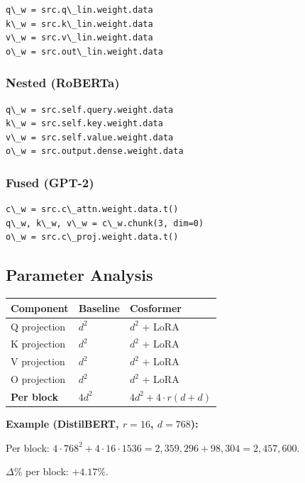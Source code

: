 \begin{lstlisting}
q\_w = src.q\_lin.weight.data
k\_w = src.k\_lin.weight.data
v\_w = src.v\_lin.weight.data
o\_w = src.out\_lin.weight.data
\end{lstlisting}

\subsubsection{Nested (RoBERTa)}

\begin{lstlisting}
q\_w = src.self.query.weight.data
k\_w = src.self.key.weight.data
v\_w = src.self.value.weight.data
o\_w = src.output.dense.weight.data
\end{lstlisting}

\subsubsection{Fused (GPT-2)}

\begin{lstlisting}
c\_w = src.c\_attn.weight.data.t()
q\_w, k\_w, v\_w = c\_w.chunk(3, dim=0)
o\_w = src.c\_proj.weight.data.t()
\end{lstlisting}

\subsection{Parameter Analysis}

\begin{table}[H]
\centering
\small
\begin{tabular}{lll}
\toprule
\textbf{Component} & \textbf{Baseline} & \textbf{Cosformer} \\
\midrule
Q projection & $d^2$ & $d^2$ + LoRA \\
K projection & $d^2$ & $d^2$ + LoRA \\
V projection & $d^2$ & $d^2$ + LoRA \\
O projection & $d^2$ & $d^2$ + LoRA \\
\textbf{Per block} & $4d^2$ & $4d^2 + 4 \cdot r(d + d)$ \\
\bottomrule
\end{tabular}
\end{table}

\textbf{Example (DistilBERT, $r = 16$, $d = 768$):}

Per block: $4 \cdot 768^2 + 4 \cdot 16 \cdot 1536 = 2{,}359{,}296 + 98{,}304 
= 2{,}457{,}600$.

$\Delta$\% per block: $+4.17\%$.

